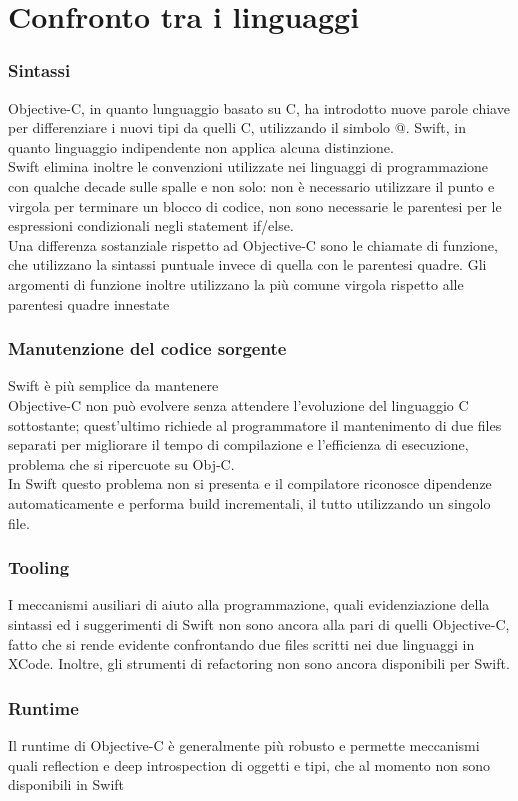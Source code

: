 \chapter{Confronto tra i linguaggi}
\subsection{Sintassi}
Objective-C, in quanto lunguaggio basato su C, ha introdotto nuove parole chiave per differenziare i nuovi tipi da quelli C, utilizzando il simbolo @. Swift, in quanto linguaggio indipendente non applica alcuna distinzione.\\
Swift elimina inoltre le convenzioni utilizzate nei linguaggi di programmazione con qualche decade sulle spalle e non solo: non è necessario utilizzare il punto e virgola per terminare un blocco di codice, non sono necessarie le parentesi per le espressioni condizionali negli statement if/else.\\
Una differenza sostanziale rispetto ad Objective-C sono le chiamate di funzione, che utilizzano la sintassi puntuale invece di quella con le parentesi quadre. Gli argomenti di funzione inoltre utilizzano la più comune virgola rispetto alle parentesi quadre innestate
\subsection{Manutenzione del codice sorgente}
Swift è più semplice da mantenere\\
Objective-C non può evolvere senza attendere l'evoluzione del linguaggio C sottostante; quest'ultimo richiede al programmatore il mantenimento di due files separati per migliorare il tempo di compilazione e l'efficienza di esecuzione, problema che si ripercuote su Obj-C.\\
In Swift questo problema non si presenta e il compilatore riconosce dipendenze automaticamente e performa build incrementali, il tutto utilizzando un singolo file.
\subsection{Tooling}
I meccanismi ausiliari di aiuto alla programmazione, quali evidenziazione della sintassi ed i suggerimenti di Swift non sono ancora alla pari di quelli Objective-C, fatto che si rende evidente confrontando due files scritti nei due linguaggi in XCode. Inoltre, gli strumenti di refactoring non sono ancora disponibili per Swift.
\subsection{Runtime}
Il runtime di Objective-C è generalmente più robusto e permette meccanismi quali reflection e deep introspection di oggetti e tipi, che al momento non sono disponibili in Swift
